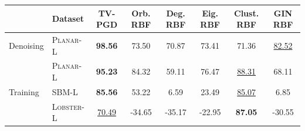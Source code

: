 \begin{tabular}{llcccccc}
\toprule
 & \textbf{Dataset} & \textbf{TV-PGD} & \textbf{Orb. RBF} & \textbf{Deg. RBF} & \textbf{Eig. RBF} & \textbf{Clust. RBF} & \textbf{GIN RBF} \\
\midrule
Denoising & \textsc{Planar-L} & \textbf{98.56} & 73.50 & 70.87 & 73.41 & 71.36 & \underline{82.52} \\
\midrule
\multirow{3}{*}{Training} & \textsc{Planar-L} & \textbf{95.23} & 84.32 & 59.11 & 76.47 & \underline{88.31} & 68.11 \\
 & \textsc{SBM-L} & \textbf{85.56} & 53.22 & 6.59 & 23.49 & \underline{85.07} & 6.85 \\
 & \textsc{Lobster-L} & \underline{70.49} & -34.65 & -35.17 & -22.95 & \textbf{87.05} & -30.55 \\
\bottomrule
\end{tabular}